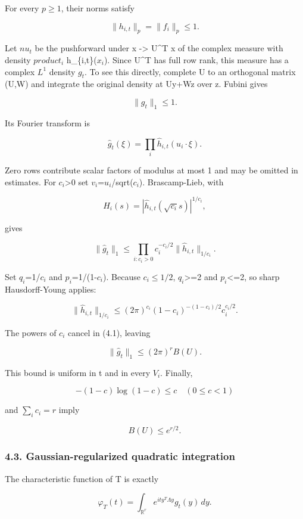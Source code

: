 \documentclass[
  11pt,
]{article}
\begin{document}
For every \(p\ge1\), their norms satisfy

\[
\lVert h_{i,t}\rVert_p=\lVert f_i\rVert_p\le1.
\]

Let \(nu_t\) be the pushforward under x -\textgreater{} U\^{}T x of the
complex measure with density \(product_i\) h\_\{i,t\}(\(x_i\)). Since
U\^{}T has full row rank, this measure has a complex \(L^1\) density
\(g_t\). To see this directly, complete U to an orthogonal matrix (U,W)
and integrate the original density at Uy+Wz over z. Fubini gives

\[
\lVert g_t\rVert_1\le1.
\]

Its Fourier transform is

\[
\widehat g_t(\xi)=\prod_i\widehat h_{i,t}(u_i\cdot\xi).
\]

Zero rows contribute scalar factors of modulus at most 1 and may be
omitted in estimates. For \(c_i\)\textgreater0 set
\(v_i\)=\(u_i\)/sqrt(\(c_i\)). Brascamp-Lieb, with

\[
H_i(s)=|\widehat h_{i,t}(\sqrt{c_i}s)|^{1/c_i},
\]

gives

\[
\lVert\widehat g_t\rVert_1
\le\prod_{i:c_i>0}c_i^{-c_i/2}
\lVert\widehat h_{i,t}\rVert_{1/c_i}.
\tag{4.1}
\]

Set \(q_i\)=1/\(c_i\) and \(p_i\)=1/(1-\(c_i\)). Because \(c_i\le1/2\),
\(q_i\)\textgreater=2 and \(p_i\)\textless=2, so sharp Hausdorff-Young
applies:

\[
\lVert\widehat h_{i,t}\rVert_{1/c_i}
\le(2\pi)^{c_i}(1-c_i)^{-(1-c_i)/2}c_i^{c_i/2}.
\]

The powers of \(c_i\) cancel in (4.1), leaving

\[
\boxed{\lVert\widehat g_t\rVert_1\le(2\pi)^rB(U).}
\tag{4.2}
\]

This bound is uniform in t and in every \(V_i\). Finally,

\[
-(1-c)\log(1-c)\le c\quad(0\le c<1)
\]

and \(\sum_i c_i=r\) imply

\[
B(U)\le e^{r/2}.
\tag{4.3}
\]

\subsubsection{4.3. Gaussian-regularized quadratic
integration}\label{gaussian-regularized-quadratic-integration}

The characteristic function of T is exactly

\[
\varphi_T(t)=\int_{\mathbb R^r}e^{it y^T\Lambda y}g_t(y)\,dy.
\]
\end{document}
